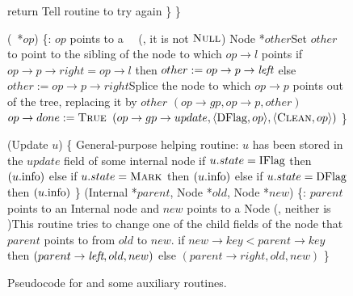 \begin{figure}[H]
\begin{code}
		return \FALSE\tabtabcom Tell  routine to try again\nlc
		\p       \}\nlc
		\p
		\}\bl
		\nlc
		
		(\DFlag\ *$op$) \{\ul
		\n   {}:  $op$ points to a \DFlag\ \record\  (\ie, it is not $\mbox{\sc Null}$)\nlc
		Node *$other$\bl\ul
		\com Set $other$ to point to the sibling of the node to which  $op\rightarrow l$ points \nlc
		if $op\rightarrow p\rightarrow right = op\rightarrow l$ then $other := op\rightarrow p \rightarrow \mbox{\it left}$ else $other:=op\rightarrow p\rightarrow right$\label{read-other}\ul 
		\com Splice the node to which $op\rightarrow p$ points out of the tree, replacing it by $other$\nlc
		$(op\rightarrow gp, op\rightarrow p, other)$ \label{dchild-cas}\nlc
		\textcolor{blue}{$op \rightarrow done := \mbox{\sc True}$}  \nlc
		\CASB$(op\rightarrow gp\rightarrow update, \langle \mbox{DFlag}, op\rangle, \langle \mbox{\sc Clean}, op\rangle)$ \label{dunflag-cas}\nlc
		\p
		\}\bl\nlc
		
		(Update $u$) \{ \tabtabcom General-purpose helping routine\ul
		\n    {}:  $u$ has been stored in the $update$ field of some internal node\nlc
		if $u.state = \mbox{IFlag}$ then $(u.\mbox{info})$\label{call-HelpInsert}\nlc
		else if $u.state = \mbox{\sc Mark}$ then $(u.\mbox{info})$\label{call-hm2}\nlc
		else if $u.state = \mbox{DFlag}$ then $(u.\mbox{info})$\label{call-HelpDelete}\nlc
		\p
		\}\bl
		\nlc
		(Internal *$parent$, Node *$old$, Node *$new$) \{\label{CAS-Child}\ul
		\n  {}:  $parent$ points to an Internal node and $new$ points to a Node (\ie, neither is \NULL)\ul
		\com This routine tries to change one of the child fields of the node that $parent$ points to from $old$ to $new$.\nlc
		if $new \rightarrow key < parent\rightarrow key$ then\label{which-child}\nlc
		\n       \CASB$(parent\rightarrow \mbox{\it left}, old, new)$\label{child-cas-1}\nlc
		\p  else\nlc
		\n       \CASB$(parent\rightarrow right, old, new)$\label{child-cas-2}\nlc
		\p\p 
		\}
	\end{code}
	\caption{\label{code3}Pseudocode for  and some auxiliary routines.}
\end{figure}





